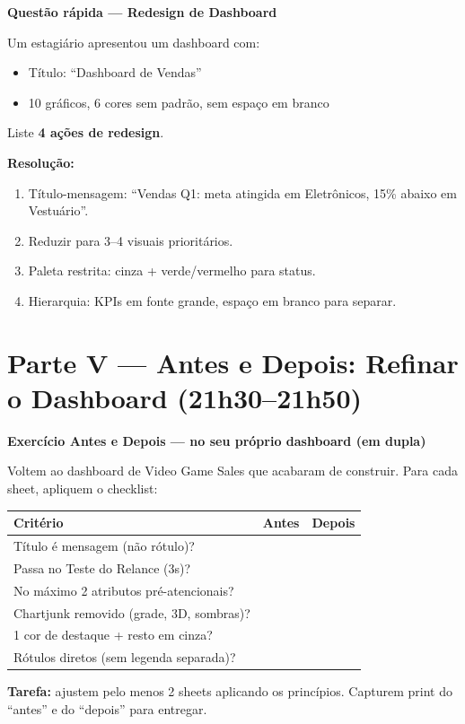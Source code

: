 \begin{SolvedBox}
\textbf{Questão rápida — Redesign de Dashboard}

Um estagiário apresentou um dashboard com:
\begin{itemize}
  \item Título: ``Dashboard de Vendas''
  \item 10 gráficos, 6 cores sem padrão, sem espaço em branco
\end{itemize}

Liste \textbf{4 ações de redesign}.

\textbf{Resolução:}
\begin{enumerate}
  \item Título-mensagem: ``Vendas Q1: meta atingida em Eletrônicos,
  15\% abaixo em Vestuário''.
  \item Reduzir para 3–4 visuais prioritários.
  \item Paleta restrita: cinza + verde/vermelho para status.
  \item Hierarquia: KPIs em fonte grande, espaço em branco para separar.
\end{enumerate}
\end{SolvedBox}

\section{Parte V — Antes e Depois: Refinar o Dashboard (21h30–21h50)}

\begin{BoardBox}
\textbf{Exercício Antes e Depois — no seu próprio dashboard (em dupla)}

Voltem ao dashboard de Video Game Sales que acabaram de construir. Para cada
sheet, apliquem o checklist:

\begin{tabular}{|p{5cm}|l|l|}
\hline
\textbf{Critério} & \textbf{Antes} & \textbf{Depois} \\
\hline
Título é mensagem (não rótulo)? & & \\
Passa no Teste do Relance (3s)? & & \\
No máximo 2 atributos pré-atencionais? & & \\
Chartjunk removido (grade, 3D, sombras)? & & \\
1 cor de destaque + resto em cinza? & & \\
Rótulos diretos (sem legenda separada)? & & \\
\hline
\end{tabular}

\textbf{Tarefa:} ajustem pelo menos 2 sheets aplicando os princípios.
Capturem print do ``antes'' e do ``depois'' para entregar.
\end{BoardBox}


